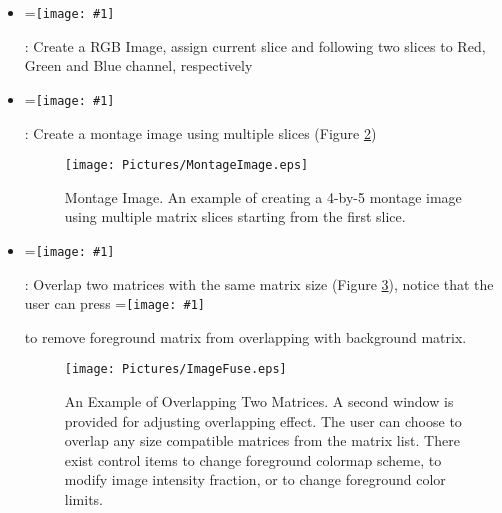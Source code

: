 \documentclass{article}%
\newcommand{\vcenteredinclude}[1]{
\begingroup
\setbox0=\hbox{\texttt{[image: \#1]}}
\parbox{\wd0}{\box0}\endgroup}
\begin{document}
\begin{enumerate}
\begin{itemize}
			\begin{itemize}
					\item \vcenteredinclude{Pictures/RedBar.eps} : Activate or deactivate localizer line on main display
					\item \vcenteredinclude{Pictures/YellowBar.eps} : Activate or deactivate localizer line on main display
					\item \vcenteredinclude{Pictures/Switch.eps} : Switch matrices between main display and second display. This operation simply permutes current matrix into its orthogonal version. The user can save the transformed matrix using (\vcenteredinclude{Pictures/Upload.eps}).
			\end{itemize}

			\begin{figure}[htbp]
				\centering
					\texttt{[image: Pictures/3DSlice.eps]}
				\caption{3D Slicer. To change view slice, the user needs to activate localizer line and then click on desired coordinate on the main display window.}
				\label{fig:3DSlice}
			\end{figure}	

		\item \vcenteredinclude{Pictures/RGBImage.eps} : Create a RGB Image, assign current slice and following two slices to Red, Green and Blue channel, respectively
		\item \vcenteredinclude{Pictures/Montage.eps} : Create a montage image using multiple slices (Figure \ref{fig:MontageImage})
		
		\begin{figure}[htbp]
			\centering
				\texttt{[image: Pictures/MontageImage.eps]}
			\caption{Montage Image. An example of creating a 4-by-5 montage image using multiple matrix slices starting from the first slice.}
			\label{fig:MontageImage}
		\end{figure}
		
		\item \vcenteredinclude{Pictures/Fuse.eps} : Overlap two matrices with the same matrix size (Figure \ref{fig:ImageFuse}), notice that the user can press \vcenteredinclude{Pictures/Release.eps} to remove foreground matrix from overlapping with background matrix.
		
	\begin{figure}[htbp]
		\centering
			\texttt{[image: Pictures/ImageFuse.eps]}
		\caption{An Example of Overlapping Two Matrices. A second window is provided for adjusting overlapping effect. The user can choose to overlap any size compatible matrices from the matrix list. There exist control items to change foreground colormap scheme, to modify image intensity fraction, or to change foreground color limits.}
		\label{fig:ImageFuse}
	\end{figure}			
	

\end{itemize}
\end{enumerate}
\end{document}
